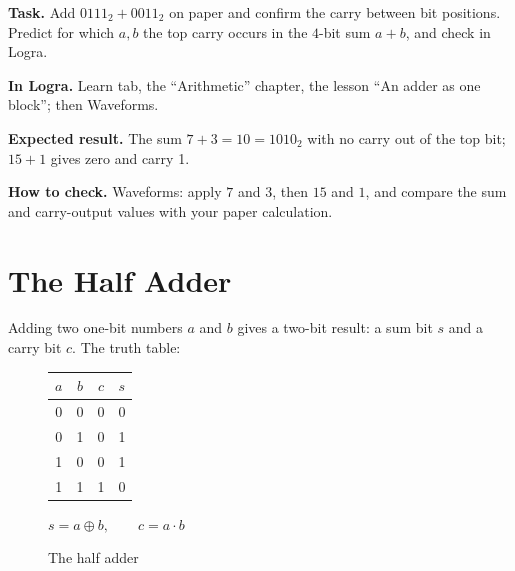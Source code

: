 \begin{diybox}
\textbf{Task.}  Add $0111_2+0011_2$ on paper and confirm the carry
between bit positions.  Predict for which $a,b$ the top carry occurs in
the $4$-bit sum $a+b$, and check in Logra.

\textbf{In Logra.} Learn tab, the ``Arithmetic'' chapter, the lesson ``An adder
as one block''; then Waveforms.

\textbf{Expected result.} The sum $7+3=10=1010_2$ with no carry out of the top
bit; $15+1$ gives zero and carry 1.

\textbf{How to check.} Waveforms: apply $7$ and $3$, then $15$ and $1$, and
compare the sum and carry-output values with your paper calculation.
\end{diybox}

\section{The Half Adder}

Adding two one-bit numbers $a$ and $b$ gives a two-bit result: a sum bit $s$ and
a carry bit $c$. The truth table:

\begin{figure}[H]
\centering
\begin{minipage}{0.35\textwidth}
\centering
\begin{tabular}{cc|cc}
\toprule
$a$ & $b$ & $c$ & $s$ \\
\midrule
0 & 0 & 0 & 0 \\
0 & 1 & 0 & 1 \\
1 & 0 & 0 & 1 \\
1 & 1 & 1 & 0 \\
\bottomrule
\end{tabular}

\medskip
$s = a \oplus b, \qquad c = a\cdot b$
\end{minipage}
\begin{minipage}{0.55\textwidth}
\centering
{}
\end{minipage}
\caption{The half adder}
\label{fig:ha}
\end{figure}

